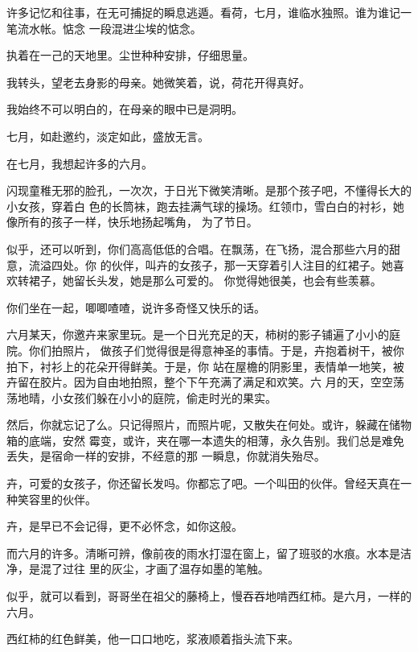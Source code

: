 		许多记忆和往事，在无可捕捉的瞬息逃遁。看荷，七月，谁临水独照。谁为谁记一笔流水帐。惦念
	一段混进尘埃的惦念。

		执着在一己的天地里。尘世种种安排，仔细思量。\par
		我转头，望老去身影的母亲。她微笑着，说，荷花开得真好。\par
		我始终不可以明白的，在母亲的眼中已是洞明。\par
		七月，如赴邀约，淡定如此，盛放无言。

	\endwriting



		在七月，我想起许多的六月。

		闪现童稚无邪的脸孔，一次次，于日光下微笑清晰。是那个孩子吧，不懂得长大的小女孩，穿着白
	色的长筒袜，跑去挂满气球的操场。红领巾，雪白白的衬衫，她像所有的孩子一样，快乐地扬起嘴角，
	为了节日。

		似乎，还可以听到，你们高高低低的合唱。在飘荡，在飞扬，混合那些六月的甜意，流溢四处。你
	的伙伴，叫卉的女孩子，那一天穿着引人注目的红裙子。她喜欢转裙子，她留长头发，她是那么可爱的。
	你觉得她很美，也会有些羡慕。

		你们坐在一起，唧唧喳喳，说许多奇怪又快乐的话。

		六月某天，你邀卉来家里玩。是一个日光充足的天，柿树的影子铺遍了小小的庭院。你们拍照片，
	做孩子们觉得很是得意神圣的事情。于是，卉抱着树干，被你拍下，衬衫上的花朵开得鲜美。于是，你
	站在屋檐的阴影里，表情单一地笑，被卉留在胶片。因为自由地拍照，整个下午充满了满足和欢笑。六
	月的天，空空荡荡地晴，小女孩们躲在小小的庭院，偷走时光的果实。

		然后，你就忘记了么。只记得照片，而照片呢，又散失在何处。或许，躲藏在储物箱的底端，安然
	霉变，或许，夹在哪一本遗失的相薄，永久告别。我们总是难免丢失，是宿命一样的安排，不经意的那
	一瞬息，你就消失殆尽。

		卉，可爱的女孩子，你还留长发吗。你都忘了吧。一个叫田的伙伴。曾经天真在一种笑容里的伙伴。

		卉，是早已不会记得，更不必怀念，如你这般。

		而六月的许多。清晰可辨，像前夜的雨水打湿在窗上，留了班驳的水痕。水本是洁净，是混了过往
	里的灰尘，才画了温存如墨的笔触。

		\vspace{1em}

		似乎，就可以看到，哥哥坐在祖父的藤椅上，慢吞吞地啃西红柿。是六月，一样的六月。

		西红柿的红色鲜美，他一口口地吃，浆液顺着指头流下来。

